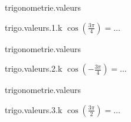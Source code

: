 \begin{qcm}{trigonometrie.valeurs}
    \begin{question}{trigo.valeurs.1.k}
         \({\cos\left(\frac{3\pi}{4}\right)}=\ldots\)
         \vspace{-1.5ex}
         \begin{multicols}{3}
         \begin{reponses}
          \lastchoices
         \end{reponses}
        \end{multicols}
    \end{question}
\end{qcm}




\begin{qcm}{trigonometrie.valeurs}
    \begin{question}{trigo.valeurs.2.k}
         \({\cos\left(-\frac{3\pi}{4}\right)}=\ldots\)
         \vspace{-1.5ex}
         \begin{multicols}{3}
         \begin{reponses}
          \lastchoices
         \end{reponses}
        \end{multicols}
    \end{question}
\end{qcm}

\begin{qcm}{trigonometrie.valeurs}
    \begin{question}{trigo.valeurs.3.k}
         \({\cos\left(\frac{3\pi}{2}\right)}=\ldots\)
         \vspace{-1.5ex}
         \begin{multicols}{3}
            \begin{reponses}
                \lastchoices
            \end{reponses}
        \end{multicols}
    \end{question}
\end{qcm}

